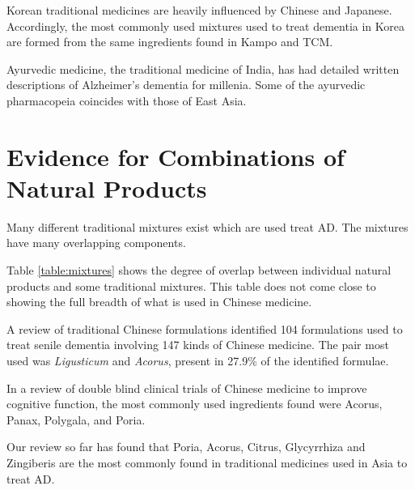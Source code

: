\documentclass[twocolumn]{article}
\begin{document}
Korean traditional medicines are heavily influenced
by Chinese and Japanese. Accordingly,
the most commonly used mixtures used to treat dementia
in Korea are formed from the same ingredients found in
Kampo and TCM.
\cite{jo2014tendency}

Ayurvedic medicine, the traditional medicine of India,
has had detailed written descriptions of Alzheimer's dementia
for millenia.
\cite{manyam1999dementia}
Some of the ayurvedic pharmacopeia coincides with those
of East Asia.












\section{Evidence for Combinations of Natural Products}

Many different traditional mixtures exist which are used
treat AD. The mixtures have many overlapping components.

Table \ref{table:mixtures} shows the degree of overlap between
individual natural products and some traditional mixtures.
This table does not come close to showing the full breadth of
what is used in Chinese medicine.

A review of traditional Chinese formulations
identified 104 formulations used to treat senile dementia
involving 147 kinds of Chinese medicine.
The pair most used was \textit{Ligusticum} and \textit{Acorus},
present in 27.9\% of the identified formulae.
\cite{zong2014analysis}

In a review of double blind clinical trials of
Chinese medicine to improve cognitive function,
the most commonly used ingredients found were
Acorus,
Panax,
Polygala,
and Poria.

Our review so far has found that
Poria,
Acorus,
Citrus,
Glycyrrhiza and
Zingiberis are the most commonly
found in traditional medicines used in Asia to treat AD.
\end{document}
